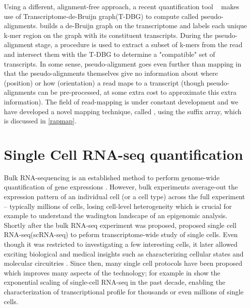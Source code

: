 Using a different, alignment-free approach, a recent quantification tool \kallisto~\citep{Bray:2015:Kallisto} makes use of Transcriptome-de-Bruijn graph(T-DBG) to compute called pseudo-alignments. \kallisto builds a de-Bruijn graph on the transcriptome and labels each unique k-mer region on the graph with its constituent transcripts. During the pseudo-alignment stage, a procedure is used to extract a subset of k-mers from the read and intersect them with the T-DBG to determine a "compatible" set of transcripts. In some sense, pseudo-alignment goes even further than mapping in that the pseudo-alignments themselves give no information about where (position) or how (orientation) a read maps to a transcript (though pseudo-alignments can be pre-processed, at some extra cost to approximate this extra information). The field of read-mapping is under constant development and we have developed a novel mapping technique, called \qm, using the suffix array, which is discussed in \cref{rapmap}.

\section{Single Cell RNA-seq quantification} 
\label{intro:singlecell}

Bulk RNA-sequencing is an established method to perform genome-wide quantification of gene expressions \citep{mortazavi2008mapping}. However, bulk experiments average-out the expression pattern of an individual cell (or a cell type) across the full experiment -- typically millions of cells, losing cell-level heterogeneity which is crucial for example to understand the wadington landscape of an epigenomic analysis. Shortly after the bulk RNA-seq experiment was proposed, \citep{tang2009mrna} proposed single cell RNA-seq(scRNA-seq) to peform transcriptome-wide study of single cells. Even though it was restricted to investigating a few interesting cells, it later allowed exciting biological and medical insights such as characterizing cellular states and molecular circuitries \citep{encode2012integrated}. Since then, many single cell protocols have been proposed which improves many aspects of the technology; for example in  \citep{svensson2018exponential} show the exponential scaling of single-cell RNA-seq in the past decade, enabling the characterization of transcriptional profile for thousands or even millions of single cells.

